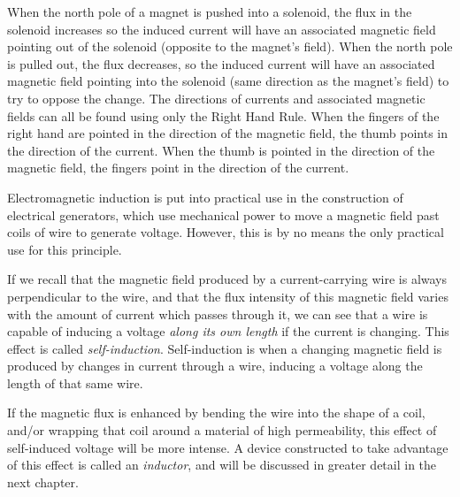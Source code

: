 When the north pole of a magnet is pushed into a solenoid, the
flux in the solenoid increases so the induced current will have an
associated magnetic field pointing out of the solenoid (opposite
to the magnet's field).  When the north pole is pulled out, the
flux decreases, so the induced current will have an associated
magnetic field pointing into the solenoid (same direction as the
magnet's field) to try to oppose the change. The directions of
currents and associated magnetic fields can all be found using
only the Right Hand Rule. When the fingers of the right hand are
pointed in the direction of the magnetic field, the thumb points in the
direction of the current. When the thumb is pointed in the
direction of the magnetic field, the fingers point in the
direction of the current.



Electromagnetic induction is put into practical use in the
construction of electrical generators, which use mechanical power
to move a magnetic field past coils of wire to generate voltage.
However, this is by no means the only practical use for this
principle.

If we recall that the magnetic field produced by a
current-carrying wire is always perpendicular to the wire, and
that the flux intensity of this magnetic field varies with the
amount of current which passes through it, we can see that a wire is capable of
inducing a voltage \textit{along its own length} if the current is changing. This effect is called
\textit{self-induction}. Self-induction is when a changing magnetic field is produced by
changes in current through a wire, inducing a voltage along the
length of that same wire.

If the magnetic flux is enhanced
by bending the wire into the shape of a coil, and/or wrapping that
coil around a material of high permeability, this effect of
self-induced voltage will be more intense. A device constructed to
take advantage of this effect is called an \textit{inductor}, and
will be discussed in greater detail in the next chapter.

